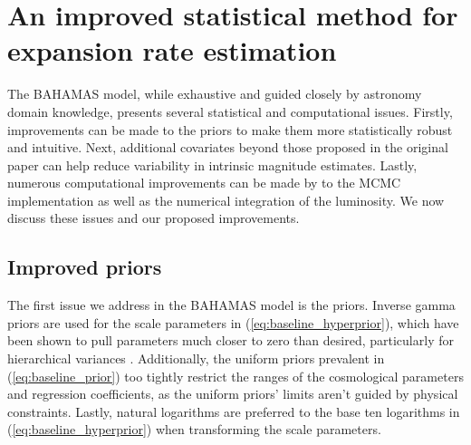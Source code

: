 \section{An improved statistical method for expansion rate estimation}
\label{sec:ode_model}

The \citet{Shariff+others:2016} BAHAMAS model, while exhaustive and guided closely by astronomy domain knowledge, presents several statistical and computational issues. Firstly, improvements can be made to the priors to make them more statistically robust and intuitive. Next, additional covariates beyond those proposed in the original paper can help reduce variability in intrinsic magnitude estimates. Lastly, numerous computational improvements can be made by to the MCMC implementation as well as the numerical integration of the luminosity. We now discuss these issues and our proposed improvements.

\subsection{Improved priors}
\label{sec:ode_new_priors}

The first issue we address in the BAHAMAS model is the priors. Inverse gamma priors are used for the scale parameters in (\ref{eq:baseline_hyperprior}), which have been shown to pull parameters much closer to zero than desired, particularly for hierarchical variances \citep{Gelman:2006}. Additionally, the uniform priors prevalent in (\ref{eq:baseline_prior}) too tightly restrict the ranges of the cosmological parameters and regression coefficients, as the uniform priors' limits aren't guided by physical constraints. Lastly, natural logarithms are preferred to the base ten logarithms in (\ref{eq:baseline_hyperprior}) when transforming the scale parameters.

